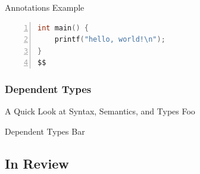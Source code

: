 \documentclass[aspectratio=169]{beamer}
\begin{document}

\begin{frame}[fragile]{Annotations Example}
  \footnotesize
       \begin{lstlisting}[language=C,numbers=left,mathescape,basicstyle={\footnotesize\ttfamily}]
int main() {
    printf("hello, world!\n");
}
$$
        \end{lstlisting}
\end{frame}

\subsubsection{Dependent Types}

\begin{frame}{A Quick Look at Syntax, Semantics, and Types}
    Foo
\end{frame}

\begin{frame}{Dependent Types}
    Bar
\end{frame}


\subsection{In Review}

\end{document}
